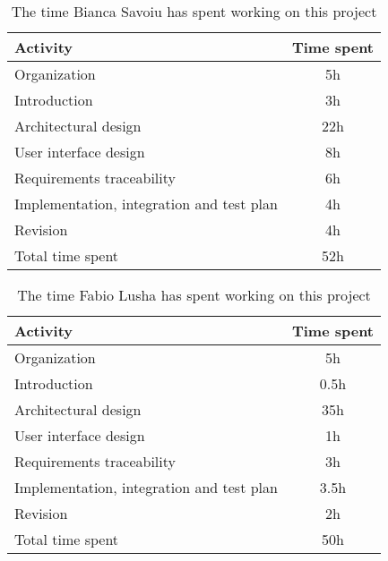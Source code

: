 \label{sec:Effort spent}%
\begin{table}[h!]
    \centering
    \begin{tabular}{|l|c|}
     \hline
     \textbf{Activity} & \textbf{Time spent} \\
    \hline
    Organization & 5h \\
    \hline
    Introduction & 3h \\
    \hline
    Architectural design & 22h \\
    \hline
    User interface design & 8h \\
    \hline
    Requirements traceability & 6h \\
    \hline
    Implementation, integration and test plan & 4h \\
    \hline
    Revision & 4h\\
    \hline
    Total time spent & 52h \\
    \hline
\end{tabular}
    \caption{The time Bianca Savoiu has spent working on this project}
    \label{tab:Assumptions}
\end{table}


\begin{table}[h!]
    \centering
    \begin{tabular}{|l|c|}
    \hline
     \textbf{Activity} & \textbf{Time spent} \\
     \hline
    Organization & 5h \\
    \hline
    Introduction & 0.5h \\
    \hline
    Architectural design & 35h \\
    \hline
    User interface design & 1h \\
    \hline
    Requirements traceability & 3h \\
    \hline
    Implementation, integration and test plan & 3.5h \\
    \hline
    Revision & 2h\\
    \hline
    Total time spent & 50h \\
    \hline
\end{tabular}
    \caption{The time Fabio Lusha has spent working on this project}
    \label{tab:Assumptions}
\end{table}